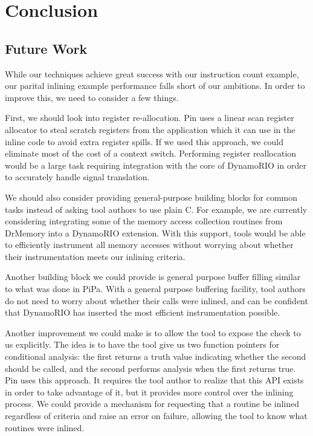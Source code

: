 \chapter{Conclusion}

\section{Future Work}

While our techniques achieve great success with our instruction count example,
our parital inlining example performance falls short of our ambitions.  In order
to improve this, we need to consider a few things.

First, we should look into register re-allocation.  Pin uses a linear scan
register allocator to steal scratch registers from the application which it can
use in the inline code to avoid extra register spills.  If we used this
approach, we could eliminate most of the cost of a context switch.  Performing
register reallocation would be a large task requiring integration with the core
of DynamoRIO in order to accurately handle signal translation.

We should also consider providing general-purpose building blocks for common
tasks instead of asking tool authors to use plain C.  For example, we are
currently considering integrating some of the memory access collection routines
from DrMemory into a DynamoRIO extension.  With this support, tools would be
able to efficiently instrument all memory accesses without worrying about
whether their instrumentation meets our inlining criteria.

Another building block we could provide is general purpose buffer filling
similar to what was done in PiPa.\cite{pipa}  With a general purpose buffering
facility, tool authors do not need to worry about whether their calls were
inlined, and can be confident that DynamoRIO has inserted the most efficient
instrumentation possible.

Another improvement we could make is to allow the tool to expose the check to us
explicitly.  The idea is to have the tool give us two function pointers for
conditional analysis: the first returns a truth value indicating whether the
second should be called, and the second performs analysis when the first returns
true.  Pin uses this approach.  It requires the tool author to realize that this
API exists in order to take advantage of it, but it provides more control over
the inlining process.  We could provide a mechanism for requesting that a
routine be inlined regardless of criteria and raise an error on failure,
allowing the tool to know what routines were inlined.

